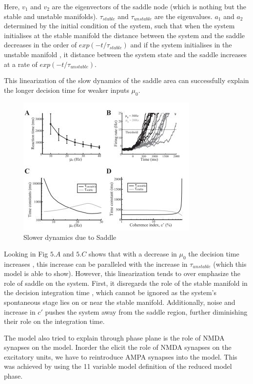 Here, $v_{1}$ and $v_{2}$ are the eigenvectors of the saddle node (which is nothing but the stable and unstable manifolds). $\tau_{stable}$ and $\tau_{unstable}$ are the eigenvalues. $a_{1}$ and $a_{2}$ determined by the initial condition of the system, such that when the system initialises at the stable manifold the distance between the system and the saddle decreases in the order of $exp(-t/\tau_{stable})$ and if the system initialises in the unstable manifold , it distance between the system state and the saddle increases at a rate of $exp(-t/\tau_{unstable})$.


This linearization of the slow dynamics of the saddle area can successfully explain the longer decision time for weaker inputs $\mu_{0}$.

\begin{figure}
  \includegraphics{fig/AnalysisSaddle.jpg}
  \caption{Slower dynamics due to Saddle}
  \label{fig:Phase Plane Analysis of Reduced Model}
\end{figure} 

 Looking in Fig $5. A$ and $5.C$ shows that with a decrease in $\mu_{0}$ the decision time increases , this increase can be paralleled with the increase in $\tau_{unstable}$ (which this model is able to show). However, this linearization tends to over emphasize the role of saddle on the system. First, it disregards the role of the stable manifold in the decision integration time , which cannot be ignored as the system's spontaneous stage lies on or near the stable manifold. Additionally, noise and increase in $c \prime$ pushes the system away from the saddle region, further diminishing their role on the integration time.

The model also tried to explain through phase plane is the role of NMDA synapses on the model. Inorder the elicit the role of NMDA synapses on the excitatory units, we have to reintroduce AMPA synapses into the model. This was achieved by using the 11 variable model definition of the reduced model phase. 







